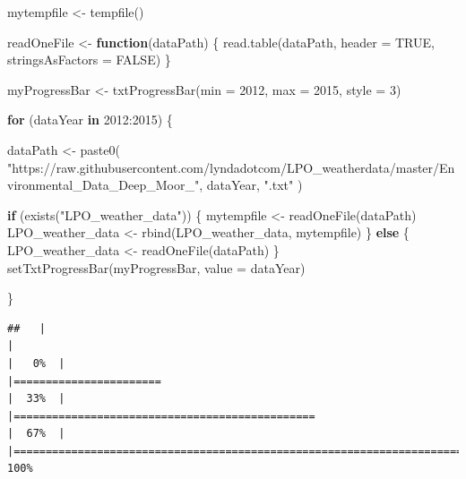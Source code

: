 \documentclass[
  11pt,
]{article}
\newenvironment{Shaded}{\begin{snugshade}}{\end{snugshade}}
\newcommand{\AttributeTok}[1]{\textcolor[rgb]{0.77,0.63,0.00}{#1}}
\newcommand{\ConstantTok}[1]{\textcolor[rgb]{0.00,0.00,0.00}{#1}}
\newcommand{\ControlFlowTok}[1]{\textcolor[rgb]{0.13,0.29,0.53}{\textbf{#1}}}
\newcommand{\DecValTok}[1]{\textcolor[rgb]{0.00,0.00,0.81}{#1}}
\newcommand{\FunctionTok}[1]{\textcolor[rgb]{0.00,0.00,0.00}{#1}}
\newcommand{\NormalTok}[1]{#1}
\newcommand{\OtherTok}[1]{\textcolor[rgb]{0.56,0.35,0.01}{#1}}
\newcommand{\SpecialCharTok}[1]{\textcolor[rgb]{0.00,0.00,0.00}{#1}}
\newcommand{\StringTok}[1]{\textcolor[rgb]{0.31,0.60,0.02}{#1}}
\begin{document}
\begin{Shaded}
\begin{Highlighting}[]
\NormalTok{mytempfile }\OtherTok{\textless{}{-}} \FunctionTok{tempfile}\NormalTok{()}

\NormalTok{readOneFile }\OtherTok{\textless{}{-}} \ControlFlowTok{function}\NormalTok{(dataPath) \{}
  \FunctionTok{read.table}\NormalTok{(dataPath,}
             \AttributeTok{header =} \ConstantTok{TRUE}\NormalTok{,}
             \AttributeTok{stringsAsFactors =} \ConstantTok{FALSE}\NormalTok{)}
\NormalTok{\}}

\NormalTok{myProgressBar }\OtherTok{\textless{}{-}} \FunctionTok{txtProgressBar}\NormalTok{(}\AttributeTok{min =} \DecValTok{2012}\NormalTok{, }\AttributeTok{max =} \DecValTok{2015}\NormalTok{, }\AttributeTok{style =} \DecValTok{3}\NormalTok{)}

\ControlFlowTok{for}\NormalTok{ (dataYear }\ControlFlowTok{in} \DecValTok{2012}\SpecialCharTok{:}\DecValTok{2015}\NormalTok{) \{}
  
\NormalTok{  dataPath }\OtherTok{\textless{}{-}}
    \FunctionTok{paste0}\NormalTok{(}
      \StringTok{"https://raw.githubusercontent.com/lyndadotcom/LPO\_weatherdata/master/Environmental\_Data\_Deep\_Moor\_"}\NormalTok{,}
\NormalTok{      dataYear,}
      \StringTok{".txt"}
\NormalTok{    )}
  
  \ControlFlowTok{if}\NormalTok{ (}\FunctionTok{exists}\NormalTok{(}\StringTok{"LPO\_weather\_data"}\NormalTok{)) \{}
\NormalTok{    mytempfile }\OtherTok{\textless{}{-}} \FunctionTok{readOneFile}\NormalTok{(dataPath)}
\NormalTok{    LPO\_weather\_data }\OtherTok{\textless{}{-}} \FunctionTok{rbind}\NormalTok{(LPO\_weather\_data, mytempfile)}
\NormalTok{  \} }\ControlFlowTok{else}\NormalTok{ \{}
\NormalTok{    LPO\_weather\_data }\OtherTok{\textless{}{-}} \FunctionTok{readOneFile}\NormalTok{(dataPath)}
\NormalTok{  \}}
  \FunctionTok{setTxtProgressBar}\NormalTok{(myProgressBar, }\AttributeTok{value =}\NormalTok{ dataYear)}
  
\NormalTok{\}}
\end{Highlighting}
\end{Shaded}

\begin{verbatim}
##   |                                                                              |                                                                      |   0%  |                                                                              |=======================                                               |  33%  |                                                                              |===============================================                       |  67%  |                                                                              |======================================================================| 100%
\end{verbatim}
\end{document}
